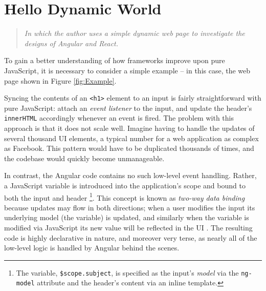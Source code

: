 \documentclass[12pt,letterpaper]{article}
\begin{document}
\section{Hello Dynamic World}
\vspace{-12pt}

\begin{quote}
	\singlespacing
	\emph{In which the author uses a simple dynamic web page to investigate the designs of Angular and React.}
\end{quote}

To gain a better understanding of how frameworks improve upon pure JavaScript, it is necessary to consider a simple example -- in this case, the web page shown in Figure \ref{fig:Example}.

\begin{SCfigure}[][h]
	\centering
	\caption{A simple example of a dynamic web element: the header text changes based on user input. Code for this example in pure JavaScript, as well as using the Angular and React frameworks, can be found in Appendix \ref{app:code}.}
	\label{fig:Example}
\end{SCfigure}

Syncing the contents of an \texttt{<h1>} element to an input is fairly straightforward with pure JavaScript: attach an \emph{event listener} to the input, and update the header's \texttt{innerHTML} accordingly whenever an event is fired. The problem with this approach is that it does not scale well. Imagine having to handle the updates of several thousand UI elements, a typical number for a web application as complex as Facebook. This pattern would have to be duplicated thousands of times, and the codebase would quickly become unmanageable.

In contrast, the Angular code contains no such low-level event handling. Rather, a JavaScript variable is introduced into the application's scope and bound to both the input and header \footnote{The variable, \texttt{\$scope.subject}, is specified as the input's \emph{model} via the \texttt{ng-model} attribute and the header's content via an inline template.}. This concept is known as \emph{two-way data binding} because updates may flow in both directions; when a user modifies the input its underlying model (the variable) is updated, and similarly when the variable is modified via JavaScript its new value will be reflected in the UI \cite{Angular:Docs}. The resulting code is highly declarative in nature, and moreover very terse, as nearly all of the low-level logic is handled by Angular behind the scenes.
\end{document}
